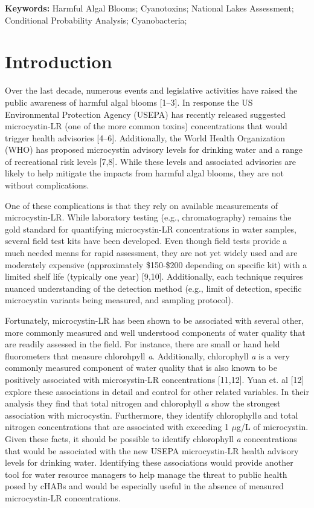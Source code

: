 \documentclass[10pt,a4paper,twocolumn]{article}
\begin{document}
\textbf{Keywords: }
Harmful Algal Blooms;
Cyanotoxins;
National Lakes Assessment;
Conditional Probability Analysis;
Cyanobacteria;

\clearpage

\section{Introduction}\label{introduction}

Over the last decade, numerous events and legislative activities have
raised the public awareness of harmful algal blooms {[}1--3{]}. In
response the US Environmental Protection Agency (USEPA) has recently
released suggested microcystin-LR (one of the more common toxins)
concentrations that would trigger health advisories {[}4--6{]}.
Additionally, the World Health Organization (WHO) has proposed
microcystin advisory levels for drinking water and a range of
recreational risk levels {[}7,8{]}. While these levels and associated
advisories are likely to help mitigate the impacts from harmful algal
blooms, they are not without complications.

One of these complications is that they rely on available measurements
of microcystin-LR. While laboratory testing (e.g., chromatography)
remains the gold standard for quantifying microcystin-LR concentrations
in water samples, several field test kits have been developed. Even
though field tests provide a much needed means for rapid assessment,
they are not yet widely used and are moderately expensive (approximately
\$150-\$200 depending on specific kit) with a limited shelf life
(typically one year) {[}9,10{]}. Additionally, each technique requires
nuanced understanding of the detection method (e.g., limit of detection,
specific microcystin variants being measured, and sampling protocol).

Fortunately, microcystin-LR has been shown to be associated with several
other, more commonly measured and well understood components of water
quality that are readily assessed in the field. For instance, there are
small or hand held fluorometers that measure chlorohpyll \emph{a}.
Additionally, chlorophyll \emph{a} is a very commonly measured component
of water quality that is also known to be positively associated with
microsystin-LR concentrations {[}11,12{]}. Yuan et. al {[}12{]} explore
these associations in detail and control for other related variables. In
their analysis they find that total nitrogen and chlorophyll \emph{a}
show the strongest association with microcystin. Furthermore, they
identify chlorophyll\emph{a} and total nitrogen concentrations that are
associated with exceeding 1 \(\mu\)g/L of microcystin. Given these
facts, it should be possible to identify chlorophyll \emph{a}
concentrations that would be associated with the new USEPA
microcystin-LR health advisory levels for drinking water. Identifying
these associations would provide another tool for water resource
managers to help manage the threat to public health posed by cHABs and
would be especially useful in the absence of measured microcystin-LR
concentrations.
\end{document}
